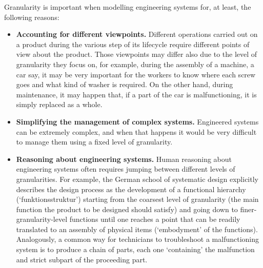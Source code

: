 \documentclass[
]{ceurart}
\begin{document}
Granularity is important when modelling engineering systems for, at least, the following reasons:
\begin{itemize}
    \item \textbf{Accounting for different viewpoints.} Different operations carried out on a product during the various step of its lifecycle require different points of view about the product. Those viewpoints may differ also due to the level of granularity they focus on, for example, during the assembly of a machine, a car say, it may be very important for the workers to know where each screw goes and what kind of washer is required. On the other hand, during maintenance, it may happen that, if a part of the car is malfunctioning, it is simply replaced as a whole.%
    \item \textbf{Simplifying the management of complex systems.} Engineered systems can be extremely complex, and when that happens it would be very difficult to manage them using a fixed level of granularity. %
    \item \textbf{Reasoning about engineering systems.} Human reasoning about engineering systems often requires jumping between different levels of granularities. For example, the German school of systematic design \cite{pahl_engineering_2007} explicitly describes the design process as the development of a functional hierarchy (`funktionsstruktur') starting from the coarsest level of granularity (the main function the product to be designed should satisfy) and going down to finer-granularity-level functions until one reaches a point that can be readily translated to an assembly of physical items (`embodyment' of the functions). Analogously, a common way for technicians to troubleshoot a malfunctioning system is to produce a chain of parts, each one `containing' the malfunction and strict subpart of the proceeding part. %

\end{itemize}
\end{document}
